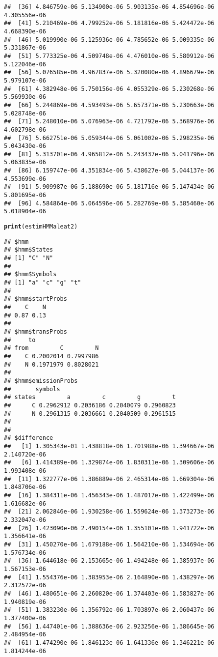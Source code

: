 \documentclass{article}
\makeatletter
\newcommand{\hlstd}[1]{\textcolor[rgb]{0.345,0.345,0.345}{#1}}%
\newcommand{\hlkwd}[1]{\textcolor[rgb]{0.737,0.353,0.396}{\textbf{#1}}}%
\newenvironment{kframe}{%
 \def\at@end@of@kframe{}%
 \ifinner\ifhmode%
  \def\at@end@of@kframe{\end{minipage}}%
  \begin{minipage}{\columnwidth}%
 \fi\fi%
 \def\FrameCommand##1{\hskip\@totalleftmargin \hskip-\fboxsep
 \colorbox{shadecolor}{##1}\hskip-\fboxsep
     \hskip-\linewidth \hskip-\@totalleftmargin \hskip\columnwidth}%
 \MakeFramed {\advance\hsize-\width
   \@totalleftmargin\z@ \linewidth\hsize
   \@setminipage}}%
 {\par\unskip\endMakeFramed%
 \at@end@of@kframe}
\newenvironment{knitrout}{}{} %
\makeatother
\begin{document}
\begin{knitrout}
\begin{kframe}
\begin{verbatim}
##  [36] 4.846759e-06 5.134900e-06 5.903135e-06 4.854696e-06 4.305556e-06
##  [41] 5.210469e-06 4.799252e-06 5.181816e-06 5.424472e-06 4.668390e-06
##  [46] 5.019990e-06 5.125936e-06 4.785652e-06 5.009335e-06 5.331867e-06
##  [51] 5.773325e-06 4.509748e-06 4.476010e-06 5.580912e-06 5.122046e-06
##  [56] 5.076585e-06 4.967837e-06 5.320080e-06 4.896679e-06 5.979107e-06
##  [61] 4.382948e-06 5.750156e-06 4.055329e-06 5.230268e-06 5.569930e-06
##  [66] 5.244869e-06 4.593493e-06 5.657371e-06 5.230663e-06 5.028748e-06
##  [71] 5.248010e-06 5.076963e-06 4.721792e-06 5.368976e-06 4.602798e-06
##  [76] 5.662751e-06 5.059344e-06 5.061002e-06 5.298235e-06 5.043430e-06
##  [81] 5.313701e-06 4.965812e-06 5.243437e-06 5.041796e-06 5.063835e-06
##  [86] 6.159747e-06 4.351834e-06 5.438627e-06 5.044137e-06 4.553699e-06
##  [91] 5.909987e-06 5.188690e-06 5.181716e-06 5.147434e-06 5.801695e-06
##  [96] 4.584864e-06 5.064596e-06 5.282769e-06 5.385460e-06 5.018904e-06
\end{verbatim}
\begin{alltt}
\hlkwd{print}\hlstd{(estimHMMaleat2)}
\end{alltt}
\begin{verbatim}
## $hmm
## $hmm$States
## [1] "C" "N"
## 
## $hmm$Symbols
## [1] "a" "c" "g" "t"
## 
## $hmm$startProbs
##    C    N 
## 0.87 0.13 
## 
## $hmm$transProbs
##     to
## from         C         N
##    C 0.2002014 0.7997986
##    N 0.1971979 0.8028021
## 
## $hmm$emissionProbs
##       symbols
## states         a         c         g         t
##      C 0.2962912 0.2036186 0.2040079 0.2960823
##      N 0.2961315 0.2036661 0.2040509 0.2961515
## 
## 
## $difference
##   [1] 1.305343e-01 1.438818e-06 1.701988e-06 1.394667e-06 2.140720e-06
##   [6] 1.414389e-06 1.329874e-06 1.830311e-06 1.309606e-06 1.993408e-06
##  [11] 1.322777e-06 1.386889e-06 2.465314e-06 1.669304e-06 1.848706e-06
##  [16] 1.384311e-06 1.456343e-06 1.487017e-06 1.422499e-06 1.616682e-06
##  [21] 2.062846e-06 1.930258e-06 1.559624e-06 1.373273e-06 2.332047e-06
##  [26] 1.423090e-06 2.490154e-06 1.355101e-06 1.941722e-06 1.356641e-06
##  [31] 1.450270e-06 1.679188e-06 1.564210e-06 1.534694e-06 1.576734e-06
##  [36] 1.644618e-06 2.153665e-06 1.494248e-06 1.385937e-06 1.567153e-06
##  [41] 1.554376e-06 1.383953e-06 2.164890e-06 1.438297e-06 2.312572e-06
##  [46] 1.480651e-06 2.260820e-06 1.374403e-06 1.583827e-06 1.940819e-06
##  [51] 1.383230e-06 1.356792e-06 1.703897e-06 2.060437e-06 1.377400e-06
##  [56] 1.447401e-06 1.388636e-06 2.923256e-06 1.386645e-06 2.484954e-06
##  [61] 1.474290e-06 1.846123e-06 1.641336e-06 1.346221e-06 1.814244e-06

\end{verbatim}
\end{kframe}
\end{knitrout}
\end{document}
